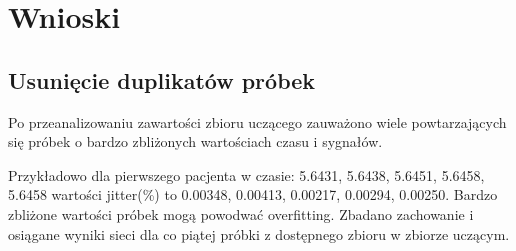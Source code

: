 \documentclass[12pt]{article}
\begin{document}
\section{Wnioski}

\newpage
\subsection{Usunięcie duplikatów próbek}
Po przeanalizowaniu zawartości zbioru uczącego zauważono wiele powtarzających się próbek o bardzo zbliżonych wartościach czasu i sygnałów. 

Przykładowo dla pierwszego pacjenta w czasie: 5.6431, 5.6438, 5.6451, 5.6458, 5.6458 wartości jitter(\%) to 0.00348, 0.00413, 0.00217, 0.00294, 0.00250. Bardzo zbliżone wartości próbek mogą powodwać overfitting. Zbadano zachowanie i osiągane wyniki sieci dla co piątej próbki z dostępnego zbioru w zbiorze uczącym.
\end{document}
